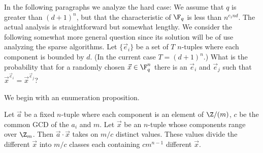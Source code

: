 In the following paragraphs we analyze the hard case: We assume that $q$
is greater than $(d+1)^n$, but that the characteristic of $\F_q$ is less
than $n^{c_1 nd}$.  The actual analysis is straightforward but somewhat
lengthy.  We consider the following somewhat more general question since
its solution will be of use analyzing the sparse algorithms.  Let
$\{\vec e_i\}$ be a set of $T$ $n$-tuples where each component is
bounded by $d$.  (In the current case $T = (d+1)^n$.) What is the
probability that for a randomly chosen $\vec x \in \F_q^n$ there is an
$\vec e_i$ and $\vec e_j$ such that $\vec x^{\vec e_i} = \vec x^{\vec
e_j}$?

\medskip
We begin with an enumeration proposition.

\begin{proposition}
Let $\vec a$ be a fixed $n$-tuple where each component is
an element of $\Z/(m)$, $c$ be the common GCD of the $a_i$ and
$m$.  Let $\vec x$ be an $n$-tuple whose components range over $\Z_m$.  Then
$\vec a \cdot \vec x$ takes on $m/c$ distinct values.  These values
divide the different $\vec x$ into $m/c$ classes each containing $c
m^{n-1}$ different $\vec x$.
\end{proposition}

